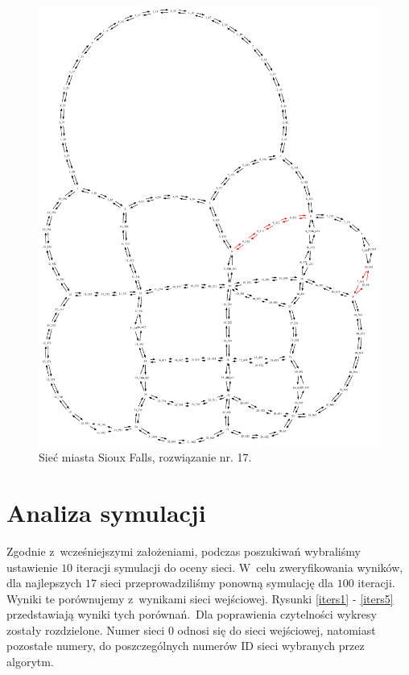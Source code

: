 \documentclass[twoside,12pt]{report}
\begin{document}
\begin{figure}[ht]
\centering
\includegraphics[totalheight=0.580\textheight, angle=90]{img/sioux-out/17/network2}
\caption{Sieć miasta Sioux Falls, rozwiązanie nr. 17.}
\label{sioux17}
\end{figure}

\clearpage
\section{Analiza symulacji}

Zgodnie z~wcześniejszymi założeniami, podczas poszukiwań wybraliśmy ustawienie $10$ iteracji symulacji do oceny sieci. W~celu zweryfikowania wyników, dla najlepszych $17$ sieci przeprowadziliśmy ponowną symulację dla $100$ iteracji. Wyniki te porównujemy z~wynikami sieci wejściowej. Rysunki \ref{iters1} - \ref{iters5} przedstawiają wyniki tych porównań.~Dla poprawienia czytelności wykresy zostały rozdzielone. Numer sieci $0$ odnosi się do sieci wejściowej, natomiast pozostałe numery, do poszczególnych numerów ID sieci wybranych przez algorytm.
\end{document}
